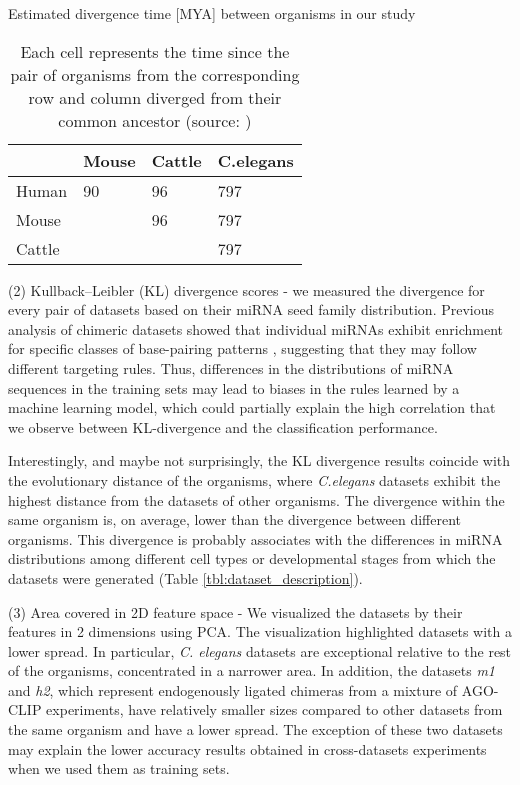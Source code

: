 \documentclass{bmcart}
\begin{document}
\begin{table}[h!]
\caption{Estimated divergence time {[}MYA{]} between organisms in our study}
\label{tab:evolutiontime}
\centering
\begin{tabular}{|l|l|l|l|}
\hline
             & Mouse & Cattle & C.elegans \\ \hline
Human & 90  & 96         & 797                    \\ \hline
Mouse          &     & 96         & 797                    \\ \hline
Cattle   &     &            & 797                    \\ \hline
\end{tabular}
\caption*{Each cell represents the time since the pair of organisms from the corresponding row and column diverged from their common ancestor (source: \cite{kumar2017timetree})}
\end{table}



(2) Kullback–Leibler (KL) divergence scores -  we measured the divergence for every pair of datasets based on their miRNA seed family distribution. Previous analysis of chimeric datasets showed that individual miRNAs exhibit enrichment for specific classes of base-pairing patterns \cite{helwak2013mapping, broughton2016pairing}, suggesting that they may follow different targeting rules.
Thus, differences in the distributions of miRNA sequences in the training sets may lead to biases in the rules learned by a machine learning model, which could partially explain the high correlation that we observe between KL-divergence and the classification performance.  

Interestingly, and maybe not surprisingly, the KL divergence results coincide with the evolutionary distance of the organisms, where \textit{C.elegans} datasets exhibit the highest distance from the datasets of other organisms. The divergence within the same organism is, on average, lower than the divergence between different organisms. This divergence is probably associates with the differences in miRNA distributions among different cell types or developmental stages from which the datasets were generated (Table \ref{tbl:dataset_description}). 

(3) Area covered in 2D feature space - We visualized the datasets by their features in 2 dimensions using PCA. The visualization highlighted datasets with a lower spread. In particular, \textit{C. elegans} datasets are exceptional relative to the rest of the organisms, concentrated in a narrower area. In addition, the datasets \textit{m1} and \textit{h2}, which represent endogenously ligated chimeras from a mixture of AGO-CLIP experiments, have relatively smaller sizes compared to other datasets from the same organism and have a lower spread. The exception of these two datasets may explain the lower accuracy results obtained in cross-datasets experiments when we used them as training sets.
\end{document}
